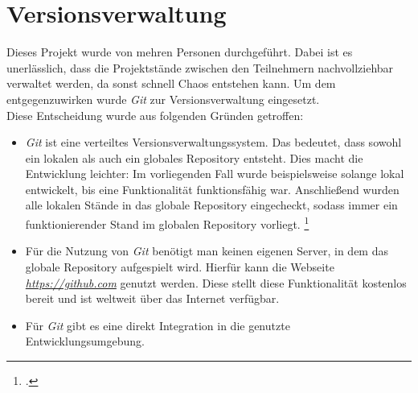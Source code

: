 \section{Versionsverwaltung}
\label{sec:versionsverwaltung}
Dieses Projekt wurde von mehren Personen durchgeführt. Dabei ist es unerlässlich, dass die Projektstände zwischen den Teilnehmern nachvollziehbar verwaltet werden, da sonst schnell Chaos entstehen kann. Um dem entgegenzuwirken wurde \textit{Git} zur Versionsverwaltung eingesetzt. \\
Diese Entscheidung wurde aus folgenden Gründen getroffen:
\begin{itemize}
\item \textit{Git} ist eine verteiltes Versionsverwaltungssystem. Das bedeutet, dass sowohl ein lokalen als auch ein globales Repository entsteht. Dies macht die Entwicklung leichter: Im vorliegenden Fall wurde beispielsweise solange lokal entwickelt, bis eine Funktionalität funktionsfähig war. Anschließend wurden alle lokalen Stände in das globale Repository eingecheckt, sodass immer ein funktionierender Stand im globalen Repository vorliegt. \footcite{online:definition-git}
\item Für die Nutzung von \textit{Git} benötigt man keinen eigenen Server, in dem das globale Repository aufgespielt wird. Hierfür kann die Webseite \href{https://github.com}{\textit{https://github.com}} genutzt werden. Diese stellt diese Funktionalität kostenlos bereit und ist weltweit über das Internet verfügbar. 
\item Für \textit{Git} gibt es eine direkt Integration in die genutzte Entwicklungsumgebung.
\end{itemize}